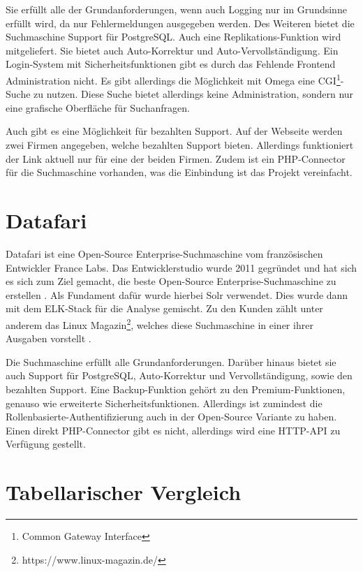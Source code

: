Sie erfüllt alle der Grundanforderungen, wenn auch Logging nur im Grundsinne erfüllt wird, da nur Fehlermeldungen ausgegeben werden. Des Weiteren bietet die Suchmaschine Support für PostgreSQL. Auch eine Replikations-Funktion wird mitgeliefert. Sie bietet auch Auto-Korrektur und Auto-Vervollständigung. Ein Login-System mit Sicherheitsfunktionen gibt es durch das Fehlende Frontend Administration nicht. Es gibt allerdings die Möglichkeit mit Omega eine CGI\footnote{Common Gateway Interface}-Suche zu nutzen. Diese Suche bietet allerdings keine Administration, sondern nur eine grafische Oberfläche für Suchanfragen.

Auch gibt es eine Möglichkeit für bezahlten Support. Auf der Webseite werden zwei Firmen angegeben, welche bezahlten Support bieten. Allerdings funktioniert der Link aktuell nur für eine der beiden Firmen. Zudem ist ein PHP-Connector für die Suchmaschine vorhanden, was die Einbindung ist das Projekt vereinfacht. \cite{XAP.2019}

\section{Datafari}
\label{datafari}

Datafari ist eine Open-Source Enterprise-Suchmaschine vom französischen Entwickler France Labs. Das Entwicklerstudio wurde 2011 gegründet und hat sich es sich zum Ziel gemacht, die beste Open-Source Enterprise-Suchmaschine zu erstellen \cite{Labs.2019}. Als Fundament dafür wurde hierbei Solr verwendet. Dies wurde dann mit dem ELK-Stack für die Analyse gemischt. Zu den Kunden zählt unter anderem das Linux Magazin\footnote{https://www.linux-magazin.de/}, welches diese Suchmaschine in einer ihrer Ausgaben vorstellt \cite{MichaelBrandenburg.2019}. 

Die Suchmaschine erfüllt alle Grundanforderungen. Darüber hinaus bietet sie auch Support für PostgreSQL, Auto-Korrektur und Vervollständigung, sowie den bezahlten Support. Eine Backup-Funktion gehört zu den Premium-Funktionen, genauso wie erweiterte Sicherheitsfunktionen. Allerdings ist zumindest die Rollenbasierte-Authentifizierung auch in der Open-Source Variante zu haben. Einen direkt PHP-Connector gibt es nicht, allerdings wird eine HTTP-API zu Verfügung gestellt. \cite{Labs.b}

\section{Tabellarischer Vergleich}

